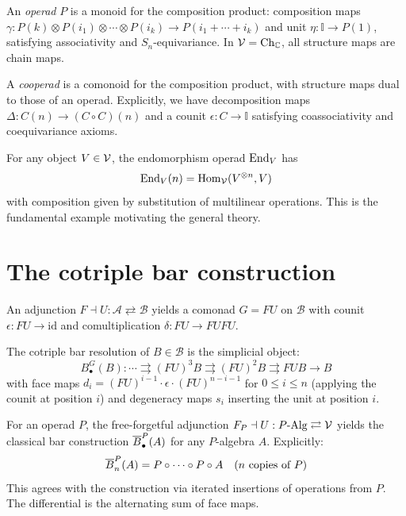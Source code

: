 \begin{definition}[Operad]
An \emph{operad} $P$ is a monoid for the composition product: composition maps $\gamma : P(k) \otimes P(i_1) \otimes \cdots \otimes P(i_k) \to P(i_1 + \cdots + i_k)$ and unit $\eta : \mathbb{I} \to P(1)$, satisfying associativity and $S_n$-equivariance. In $\mathcal{V} = \mathrm{Ch}_\mathbb{C}$, all structure maps are chain maps.
\end{definition}
 
\begin{definition}[Cooperad]
A \emph{cooperad} is a comonoid for the composition product, with structure maps dual to those of an operad. Explicitly, we have decomposition maps $\Delta : C(n) \to (C \circ C)(n)$ and a counit $\epsilon : C \to \mathbb{I}$ satisfying coassociativity and coequivariance axioms.
\end{definition}
 
\begin{example}
For any object $V \in \mathcal{V}$, the endomorphism operad $\operatorname{End}_V$ has 
\[
\operatorname{End}_V(n) = \operatorname{Hom}_{\mathcal{V}}(V^{\otimes n}, V)
\]
with composition given by substitution of multilinear operations. This is the fundamental example motivating the general theory.
\end{example}
 
\section{The cotriple bar construction}
 
An adjunction $F \dashv U : \mathcal{A} \rightleftarrows \mathcal{B}$ yields a comonad $G = FU$ on $\mathcal{B}$ with counit $\epsilon : FU \to \mathrm{id}$ and comultiplication $\delta : FU \to FUFU$.

\begin{definition}
The cotriple bar resolution of $B \in \mathcal{B}$ is the simplicial object:
\[
B^G_\bullet(B) : \cdots \rightrightarrows (FU)^3B \rightrightarrows (FU)^2B \rightrightarrows FUB \to B
\]
with face maps $d_i = (FU)^{i-1} \cdot \epsilon \cdot (FU)^{n-i-1}$ for $0 \le i \le n$ (applying the counit at position $i$) and degeneracy maps $s_i$ inserting the unit at position $i$.
\end{definition}
 
\begin{example}
For an operad $P$, the free-forgetful adjunction $F_P \dashv U : P\text{-Alg} \rightleftarrows \mathcal{V}$ yields the classical bar construction $\overline{B}^P_\bullet(A)$ for any $P$-algebra $A$. Explicitly:
\[
\overline{B}^P_n(A) = P \circ \cdots \circ P \circ A \quad \text{($n$ copies of $P$)}
\]
This agrees with the construction via iterated insertions of operations from $P$. The differential is the alternating sum of face maps.
\end{example}
 
